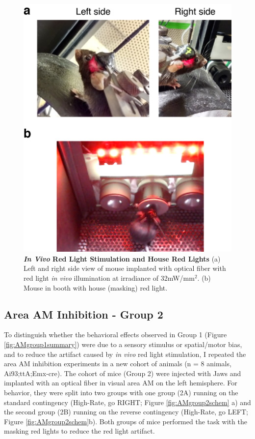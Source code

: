 \begin{figure}
  \centering
   \includegraphics[width=\textwidth]{Figures/chapter4/mouse_house_red_light.png}
  \caption[\emph{In Vivo} Red Light Stimulation and House Red Lights]{\textbf{\emph{In Vivo} Red Light Stimulation and House Red Lights} (a) Left and right side view of mouse implanted with optical fiber with red light \emph{in vivo} illumination at irradiance of 32mW/mm$^{2}$. (b) Mouse in booth with house (masking) red light.}
   \label{fig:mousehouselight}
\end{figure}
\subsection{Area AM Inhibition - Group 2}
To distinguish whether the behavioral effects observed in Group 1 (Figure \ref{fig:AMgroup1summary}) were due to a sensory stimulus or spatial/motor bias, and to reduce the artifact caused by \emph{in vivo} red light stimulation, I repeated the area AM inhibition experiments in a new cohort of animals (n = 8 animals, Ai93;ttA;Emx-cre). The cohort of mice (Group 2) were injected with Jaws and implanted with an optical fiber in visual area AM on the left hemisphere. For behavior, they were split into two groups with one group (2A) running on the standard contingency (High-Rate, go RIGHT; Figure \ref{fig:AMgroup2schem} a) and the second group (2B) running on the reverse contingency (High-Rate, go LEFT; Figure \ref{fig:AMgroup2schem}b). Both groups of mice performed the task with the masking red lights to reduce the red light artifact.\par

